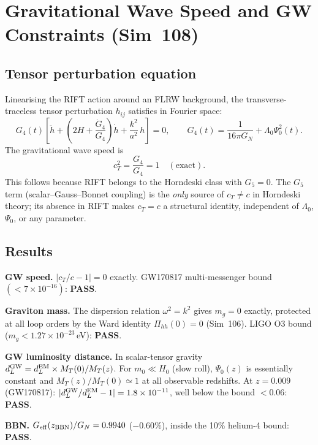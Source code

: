 \documentclass[12pt,a4paper]{article}
\begin{document}
\section{Gravitational Wave Speed and GW Constraints (Sim~108)}
\label{sec:sim108}

\subsection{Tensor perturbation equation}

Linearising the RIFT action around an FLRW background, the transverse-traceless
tensor perturbation $h_{ij}$ satisfies in Fourier space:
\begin{equation}
  G_4(t)\left[\ddot{h} + \left(2H + \frac{\dot{G}_4}{G_4}\right)\dot{h}
  + \frac{k^2}{a^2}\,h\right] = 0,
  \qquad
  G_4(t) = \frac{1}{16\pi G_N} + \Lambda_0\Psi_0^2(t).
\end{equation}
The gravitational wave speed is
\begin{equation}
  c_T^2 = \frac{G_4}{G_4} = 1 \quad (\text{exact}).
\end{equation}
This follows because RIFT belongs to the Horndeski class with $G_5=0$.
The $G_5$ term (scalar--Gauss--Bonnet coupling) is the \emph{only}
source of $c_T\ne c$ in Horndeski theory; its absence in RIFT makes
$c_T=c$ a structural identity, independent of $\Lambda_0$, $\Psi_0$,
or any parameter.

\subsection{Results}

\textbf{GW speed.} $|c_T/c - 1| = 0$ exactly.
GW170817 multi-messenger bound $(<7\times10^{-16})$: \textbf{PASS}.

\textbf{Graviton mass.} The dispersion relation $\omega^2=k^2$ gives $m_g=0$
exactly, protected at all loop orders by the Ward identity
$\Pi_{hh}(0)=0$ (Sim~106).  LIGO O3 bound ($m_g<1.27\times10^{-23}$\,eV):
\textbf{PASS}.

\textbf{GW luminosity distance.}
In scalar-tensor gravity $d_L^{\rm GW} = d_L^{\rm EM}\times M_T(0)/M_T(z)$.
For $m_0\ll H_0$ (slow roll), $\Psi_0(z)$ is essentially constant and
$M_T(z)/M_T(0)\simeq1$ at all observable redshifts.
At $z=0.009$ (GW170817): $|d_L^{\rm GW}/d_L^{\rm EM}-1|=1.8\times10^{-11}$,
well below the bound $<0.06$: \textbf{PASS}.

\textbf{BBN.} $G_{\rm eff}(z_{\rm BBN})/G_N = 0.9940$ ($-0.60\%$),
inside the 10\% helium-4 bound: \textbf{PASS}.
\end{document}
